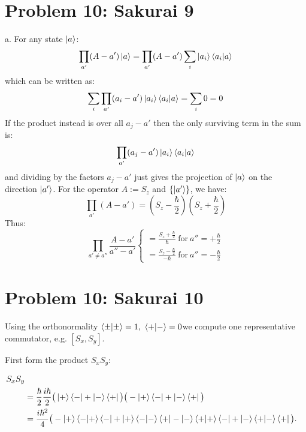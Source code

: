 \documentclass[10pt,twocoloumn]{article}
\begin{document}
\section*{Problem 10: Sakurai 9}
a. For any state $\left| a \right\rangle$:
\begin{equation}
    \prod_{a'} (A - a')\left| a \right\rangle = \prod_{a'}(A - a') \sum_i \left| a_i \right\rangle\left\langle a_i \middle| a \right\rangle
\end{equation}
which can be written as:
\begin{equation}
    \sum_i\prod_{a'} (a_i - a')\left| a_i \right\rangle\left\langle a_i \middle| a \right\rangle = \sum_i 0 = 0
\end{equation}
If the product instead is over all $a_j -a'$ then the only surviving term in the sum is:
\begin{equation}
    \prod_{a'} (a_j - a')\left| a_i \right\rangle\left\langle a_i \middle| a \right\rangle
\end{equation}
and dividing by the factors $a_j - a'$ just gives the projection of $\left| a \right\rangle$ on the direction $\left| a' \right\rangle$. For the operator $A:= S_z$ and $\{\left| a' \right\rangle\}$, we have:
\begin{equation}
    \prod_{a'}(A-a')=\left(S_z - \frac{\hbar}{2}\right)\left(S_z + \frac{\hbar}{2}\right)
\end{equation}
Thus:
\begin{equation}
    \prod_{a'\not = a''}\frac{A- a'}{a'' - a'} \begin{cases} = \frac{S_z + \frac{\hbar}{2}}{\hbar} \ \text{for} \  a'' = + \frac{\hbar}{2}
        \\
        = \frac{S_z -\frac{\hbar}{2}}{-\hbar}  \ \text{for}  \ a'' =-\frac{\hbar}{2}
    \end{cases}
\end{equation}
\section*{Problem 10: Sakurai 10}
Using the orthonormality $\left\langle \pm \middle| \pm \right\rangle=1,\ \left\langle + \middle| - \right\rangle=0$we compute one representative commutator, e.g. $[S_x,S_y]$.

First form the product $S_xS_y$:

\begin{align}
S_xS_y\\
&=\frac{\hbar}{2}\frac{i\hbar}{2}\big(\left| + \right\rangle\left\langle - \right|+\left| - \right\rangle\left\langle + \right|\big)\big(-\left| + \right\rangle\left\langle - \right|+\left| - \right\rangle\left\langle + \right|\big)
\\
&=\frac{i\hbar^2}{4}\big(
-\left| + \right\rangle\left\langle - \middle| + \right\rangle\left\langle - \right|+\left| + \right\rangle\left\langle - \middle| - \right\rangle\left\langle + \right|
-\left| - \right\rangle\left\langle + \middle| + \right\rangle\left\langle - \right|+\left| - \right\rangle\left\langle + \middle| - \right\rangle\left\langle + \right|
\big).
\end{align}
\end{document}
